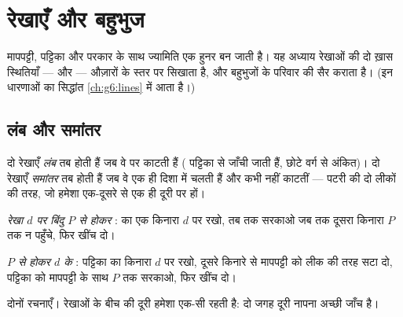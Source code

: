 \chapter{रेखाएँ और बहुभुज}\label{ch:g4:geometry}

मापपट्टी,  पट्टिका और परकार के साथ ज्यामिति एक हुनर बन जाती
है। यह अध्याय रेखाओं की दो ख़ास स्थितियाँ ---  और  ---
औज़ारों के स्तर पर सिखाता है, और बहुभुजों के परिवार की सैर कराता
है। (इन धारणाओं का सिद्धांत \cref{ch:g6:lines} में आता
है।)

\section{लंब और समांतर}

\begin{definition}[लंब, समांतर]\label{def:g4:geometry:def}
दो रेखाएँ \emph{लंब} तब होती हैं जब वे
 पर काटती हैं ( पट्टिका से जाँची जाती हैं, छोटे वर्ग
से अंकित)। दो रेखाएँ \emph{समांतर}
तब होती हैं जब वे एक ही दिशा में चलती हैं और कभी नहीं काटतीं ---
पटरी की दो लीकों की तरह, जो हमेशा एक-दूसरे से एक ही दूरी पर हों।
\end{definition}

\begin{method}[समकोण पट्टिका से बनाना]\label{met:g4:geometry:draw}
\emph{रेखा $d$ पर बिंदु $P$ से होकर }:  का एक किनारा
$d$ पर रखो, तब तक सरकाओ जब तक दूसरा किनारा $P$ तक न पहुँचे,
फिर खींच दो।

\emph{$P$ से होकर $d$ के }: पट्टिका का किनारा $d$ पर रखो,
दूसरे किनारे से मापपट्टी को लीक की तरह सटा दो, पट्टिका को
मापपट्टी के साथ $P$ तक सरकाओ, फिर खींच दो।
\end{method}

\begin{omfigure}

{\small दोनों रचनाएँ।  रेखाओं के बीच की दूरी हमेशा एक-सी
रहती है: दो जगह दूरी नापना अच्छी जाँच है।}
\end{omfigure}

